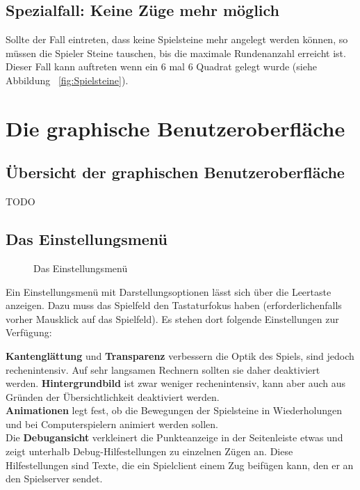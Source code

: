\documentclass[a4paper, ngerman]{scrartcl}
\begin{document}
\subsection{Spezialfall: Keine Züge mehr möglich}
Sollte der Fall eintreten, dass keine Spielsteine mehr angelegt werden können, so müssen die Spieler Steine tauschen, bis die maximale Rundenanzahl erreicht ist. Dieser Fall kann auftreten wenn ein 6 mal 6 Quadrat gelegt wurde (siehe Abbildung  ~\ref{fig:Spielsteine}).
	
\section{Die graphische Benutzeroberfläche}
\subsection{Übersicht der graphischen Benutzeroberfläche}
TODO
	
\subsection{Das Einstellungsmenü}
	 \begin{figure}[h]
		\centering
		\caption{Das Einstellungsmenü}
		\label{fig:Configuration}
	\end{figure}
	
	Ein Einstellungsmenü mit Darstellungsoptionen lässt
sich über die Leertaste anzeigen. Dazu muss das
Spielfeld den Tastaturfokus haben (erforderlichenfalls
vorher Mausklick auf das Spielfeld). Es stehen dort
folgende Einstellungen zur Verfügung:

\textbf{Kantenglättung} und \textbf{Transparenz} verbessern die Optik des
Spiels, sind jedoch rechenintensiv. Auf sehr langsamen Rechnern sollten sie daher
deaktiviert werden. \textbf{Hintergrundbild} ist zwar weniger rechenintensiv,
kann aber auch aus Gründen der Übersichtlichkeit deaktiviert werden.\\
\textbf{Animationen} legt fest, ob die Bewegungen der Spielsteine in
Wiederholungen und bei Computerspielern animiert werden sollen.\\
Die \textbf{Debugansicht} verkleinert die Punkteanzeige in der Seitenleiste
etwas und zeigt unterhalb Debug-Hilfestellungen zu einzelnen Zügen an. Diese
Hilfestellungen sind Texte, die ein Spielclient einem Zug beifügen kann, den er
an den Spielserver sendet.
	
\end{document}
